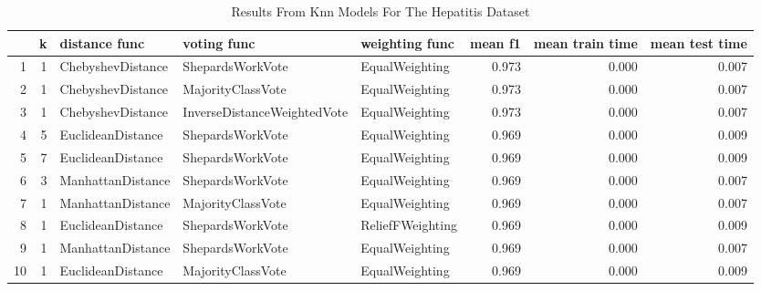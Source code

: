 \begin{table}
\centering
\caption{Results From Knn Models For The Hepatitis Dataset}
\label{tab:knn_results_hepatitis}
\begin{tabular}{rrlllrrr}
\toprule
 & k & distance func & voting func & weighting func & mean f1 & mean train time & mean test time \\
\midrule
1 & 1 & ChebyshevDistance & ShepardsWorkVote & EqualWeighting & 0.973 & 0.000 & 0.007 \\
2 & 1 & ChebyshevDistance & MajorityClassVote & EqualWeighting & 0.973 & 0.000 & 0.007 \\
3 & 1 & ChebyshevDistance & InverseDistanceWeightedVote & EqualWeighting & 0.973 & 0.000 & 0.007 \\
4 & 5 & EuclideanDistance & ShepardsWorkVote & EqualWeighting & 0.969 & 0.000 & 0.009 \\
5 & 7 & EuclideanDistance & ShepardsWorkVote & EqualWeighting & 0.969 & 0.000 & 0.009 \\
6 & 3 & ManhattanDistance & ShepardsWorkVote & EqualWeighting & 0.969 & 0.000 & 0.007 \\
7 & 1 & ManhattanDistance & MajorityClassVote & EqualWeighting & 0.969 & 0.000 & 0.007 \\
8 & 1 & EuclideanDistance & ShepardsWorkVote & ReliefFWeighting & 0.969 & 0.000 & 0.009 \\
9 & 1 & ManhattanDistance & ShepardsWorkVote & EqualWeighting & 0.969 & 0.000 & 0.007 \\
10 & 1 & EuclideanDistance & MajorityClassVote & EqualWeighting & 0.969 & 0.000 & 0.009 \\
\bottomrule
\end{tabular}
\end{table}
